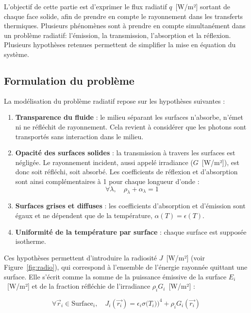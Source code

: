 
L'objectif de cette partie est d'exprimer le flux radiatif $q$~[W/m²] sortant de chaque face solide, afin de prendre en compte le rayonnement dans les transferts thermiques. Plusieurs phénomènes sont à prendre en compte simultanément dans un problème radiatif: l'émission, la transmission, l'absorption et la réflexion. Plusieurs hypothèses retenues permettent de simplifier la mise en équation du système.

\subsection{Formulation du problème}
La modélisation du problème radiatif repose sur les hypothèses suivantes :

\begin{enumerate}
    \item \textbf{Transparence du fluide} : le milieu séparant les surfaces n'absorbe, n'émet ni ne réfléchit de rayonnement. Cela revient à considérer que les photons sont transportés sans interaction dans le milieu.
    
    \item \textbf{Opacité des surfaces solides} : la transmission à travers les surfaces est négligée. Le rayonnement incident, aussi appelé irradiance ($G$~[W/m²]), est donc soit réfléchi, soit absorbé. Les coefficients de réflexion et d'absorption sont ainsi complémentaires à 1 pour chaque longueur d'onde :
    \begin{equation}
        \forall \lambda, \quad \rho_{\lambda} + \alpha_{\lambda} = 1
    \end{equation}
    
    \item \textbf{Surfaces grises et diffuses} : les coefficients d'absorption et d'émission sont égaux et ne dépendent que de la température, $\alpha(T) = \epsilon(T)$.
    
    \item \textbf{Uniformité de la température par surface} : chaque surface est supposée isotherme.
\end{enumerate}

Ces hypothèses permettent d'introduire la radiosité $J$~[W/m²] (voir Figure~\ref{fig:radio}), qui correspond à l'ensemble de l'énergie rayonnée quittant une surface. Elle s'écrit comme la somme de la puissance émissive de la surface $E_i$~[W/m²] et de la fraction réfléchie de l'irradiance $\rho_i G_i$~[W/m²] :

\begin{equation}
    \forall \vec{r}_i \in \text{Surface}_i, \quad J_i(\vec{r_i}) = \epsilon_i \sigma \big(T_i)\big)^4 + \rho_i G_i(\vec{r_i})
    \label{def:radiosite}
\end{equation} 

